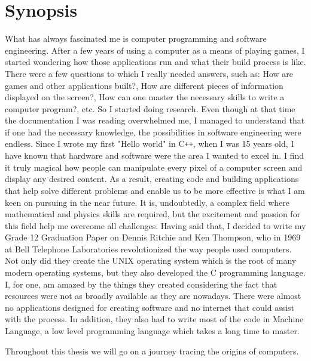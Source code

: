 \documentclass[12pt]{article}
\begin{document}
\section{Synopsis}
What has always fascinated me is computer programming and software engineering. After a few years of using a computer as a means of playing games, I started wondering how those applications run and what their build process is like. There were a few questions to which I really needed answers, such as: How are games and other applications built?, How are different pieces of information displayed on the screen?, How can one master the necessary skills to write a computer program?, etc. So I started doing research. Even though at that time the documentation I was reading overwhelmed me, I managed to understand that if one had the necessary knowledge, the possibilities in software engineering were endless. Since I wrote my first "Hello world" in C\texttt{++}, when I was 15 years old, I have known that hardware and software were the area I wanted to excel in. I find it truly magical how people can manipulate every pixel of a computer screen and display any desired content.\newline\newline
As a result, creating code and building applications that help solve different problems and enable us to be more effective is what I am keen on pursuing in the near future. It is, undoubtedly, a complex field where mathematical and physics skills are required, but the excitement and passion for this field help me overcome all challenges. \newline\newline
Having said that, I decided to write my Grade 12 Graduation Paper on Dennis Ritchie and Ken Thompson, who in 1969 at Bell Telephone Laboratories revolutionized  the way people used computers. Not only did they create the UNIX operating system which is the root of many modern operating systems, but they also developed the C programming language. I, for one, am amazed by the things they created considering the fact that resources were not as broadly available as they are nowadays. There were almost no applications designed for creating software and no internet that could assist with the process. In addition, they also had to write most of the code in Machine Language, a low level programming language which takes a long time to master.
\begin{center}
    Throughout this thesis we will go on a journey tracing the origins of computers.
\end{center}
\end{document}
